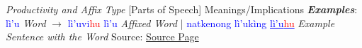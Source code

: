  \textit{Productivity and Affix Type} [Parts of Speech] Meanings/Implications \textit{\textbf{Examples}}: \textcolor{Blue}{lì'u}\textit{ Word} $\rightarrow$ \textcolor{Blue}{lì'uvi}\textcolor{Red}{hu }\textcolor{Blue}{lì'u}\textit{ Affixed Word} | \textcolor{Blue}{natkenong lì'ukìng \underline{lì'u\textcolor{Red}{hu}}}\textit{ Example Sentence with the Word} Source: \hyperlink{naviteri.org}{Source Page}\par